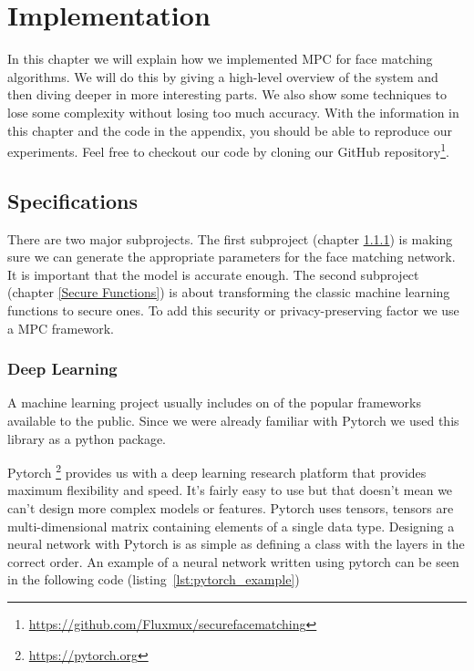 

\DeclarePairedDelimiter\floor{\lfloor}{\rfloor}

\chapter{Implementation}
In this chapter we will explain how we implemented MPC for face matching algorithms. We will do this by giving a high-level overview of the system and then diving deeper in more interesting parts. We also show some techniques to lose some complexity without losing too much accuracy. With the information in this chapter and the code in the appendix, you should be able to reproduce our experiments. Feel free to checkout our code by cloning our GitHub repository\footnote{\url{https://github.com/Fluxmux/securefacematching}}.

\section{Specifications}
There are two major subprojects. The first subproject (chapter \ref{Deep Learning}) is making sure we can generate the appropriate parameters for the face matching network. It is important that the model is accurate enough. The second subproject (chapter \ref{Secure Functions}) is about transforming the classic machine learning functions to secure ones. To add this security or privacy-preserving factor we use a MPC framework.

\subsection{Deep Learning}
\label{Deep Learning}
A machine learning project usually includes on of the popular frameworks available to the public. Since we were already familiar with Pytorch we used this library as a python package.

Pytorch \footnote{\url{https://pytorch.org}} provides us with a deep learning research platform that provides maximum flexibility and speed. It's fairly easy to use but that doesn't mean we can't design more complex models or features. Pytorch uses tensors, tensors are multi-dimensional matrix containing elements of a single data type. Designing a neural network with Pytorch is as simple as defining a class with the layers in the correct order. An example of a neural network written using pytorch can be seen in the following code (listing~\ref{lst:pytorch_example})\\

